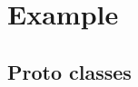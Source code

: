 \documentclass[ngerman,titlepage,parskip=true]{scrartcl}
\begin{document}
  \section{Example}
	 \subsection{Proto classes}
	 
	 
\end{document}
